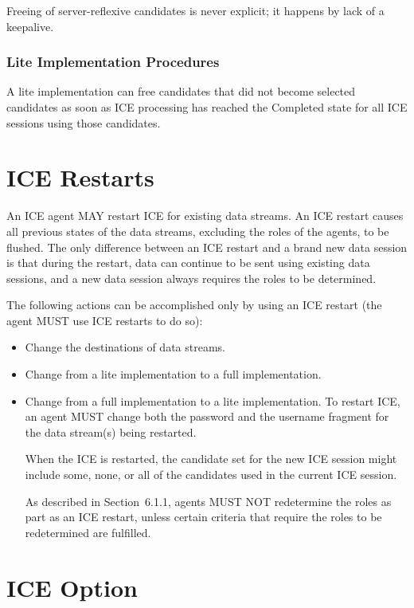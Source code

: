 \documentclass{article}
\begin{document}
Freeing of server-reflexive candidates is never explicit; it happens by lack of a keepalive.

\subsubsection{Lite Implementation Procedures}

A lite implementation can free candidates that did not become selected candidates as soon as ICE processing has reached the Completed state for all ICE sessions using those candidates.

\section{ICE Restarts}

An ICE agent MAY restart ICE for existing data streams.  An ICE restart causes all previous states of the data streams, excluding the roles of the agents, to be flushed.  The only difference between an ICE restart and a brand new data session is that during the restart, data can continue to be sent using existing data sessions, and a new data session always requires the roles to be determined.

The following actions can be accomplished only by using an ICE restart (the agent MUST use ICE restarts to do so):

\begin{itemize}
\item Change the destinations of data streams.
\item Change from a lite implementation to a full implementation.
\item Change from a full implementation to a lite implementation.
To restart ICE, an agent MUST change both the password and the username fragment for the data stream(s) being restarted.

When the ICE is restarted, the candidate set for the new ICE session might include some, none, or all of the candidates used in the current ICE session.

As described in Section~6.1.1, agents MUST NOT redetermine the roles as part as an ICE restart, unless certain criteria that require the roles to be redetermined are fulfilled.

\end{itemize}
\section{ICE Option}
\end{document}
